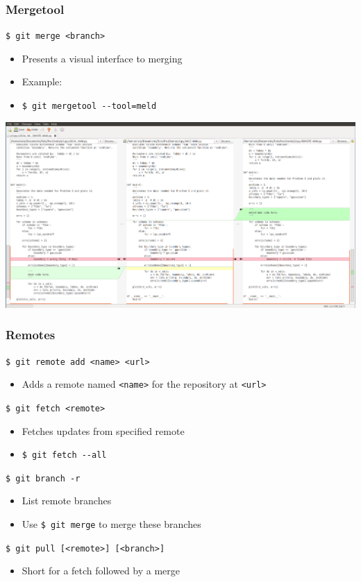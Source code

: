 \documentclass[english,compress]{beamer}
\begin{document}
\begin{frame}[fragile]
    \frametitle{Mergetool}

    \verb|$ git merge <branch>|
    \begin{itemize}
        \item Presents a visual interface to merging
        \item Example: 
		\item \verb|$ git mergetool --tool=meld|
    \end{itemize}
    \begin{center}
        \includegraphics[width=.9\textwidth]{figs/meld_screenshot}
    \end{center}

\end{frame}

\begin{frame}[fragile]
    \frametitle{Remotes}

    \verb|$ git remote add <name> <url>|
    \begin{itemize}
        \item Adds a remote named \verb|<name>| for the repository at \verb|<url>|
    \end{itemize}

    \verb|$ git fetch <remote>|
    \begin{itemize}
        \item Fetches updates from specified remote
        \item \verb|$ git fetch --all|
    \end{itemize}

    \verb|$ git branch -r |
    \begin{itemize}
        \item List remote branches
        \item Use \verb|$ git merge| to merge these branches
    \end{itemize}

    \verb|$ git pull [<remote>] [<branch>]|
    \begin{itemize}
        \item Short for a fetch followed by a merge
    \end{itemize}
\end{frame}
\end{document}
